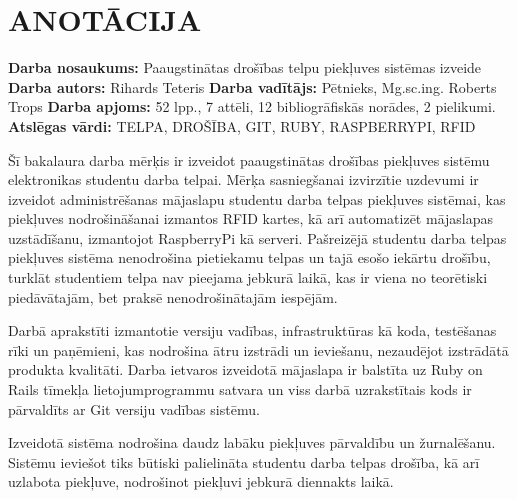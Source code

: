 \chapter*{ANOTĀCIJA}
\noindent \textbf{Darba nosaukums:} Paaugstinātas drošības telpu piekļuves sistēmas izveide\newline
\textbf{Darba autors:} Rihards Teteris\newline
\textbf{Darba vadītājs:} Pētnieks, Mg.sc.ing. Roberts Trops\newline
\textbf{Darba apjoms:} 52 lpp., 7 attēli, 12 bibliogrāfiskās norādes, 2 pielikumi.\newline
\textbf{Atslēgas vārdi:} TELPA, DROŠĪBA, GIT, RUBY, RASPBERRYPI, RFID\newline

Šī bakalaura darba mērķis ir izveidot paaugstinātas drošības piekļuves sistēmu elektronikas studentu darba telpai.
Mērķa sasniegšanai izvirzītie uzdevumi ir izveidot administrēšanas mājaslapu studentu darba telpas piekļuves sistēmai, kas piekļuves nodrošināšanai izmantos RFID kartes, kā arī automatizēt mājaslapas uzstādīšanu, izmantojot RaspberryPi kā serveri. Pašreizējā studentu darba telpas piekļuves sistēma nenodrošina pietiekamu telpas un tajā esošo iekārtu drošību, turklāt studentiem telpa nav pieejama jebkurā laikā, kas ir viena no teorētiski piedāvātajām, bet praksē nenodrošinātajām iespējām.

Darbā aprakstīti izmantotie versiju vadības, infrastruktūras kā koda, testēšanas rīki un paņēmieni, kas nodrošina ātru izstrādi un ieviešanu, nezaudējot izstrādātā produkta kvalitāti. Darba ietvaros izveidotā mājaslapa ir balstīta uz Ruby on Rails tīmekļa lietojumprogrammu satvara un viss darbā uzrakstītais kods ir pārvaldīts ar Git versiju vadības sistēmu.

Izveidotā sistēma nodrošina daudz labāku piekļuves pārvaldību un žurnalēšanu. Sistēmu ieviešot tiks būtiski palielināta studentu darba telpas drošība, kā arī uzlabota piekļuve, nodrošinot piekļuvi jebkurā diennakts laikā.
